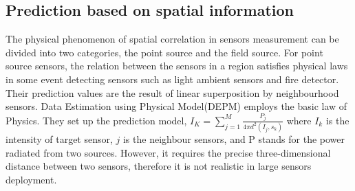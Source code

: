 \subsection{Prediction based on spatial information}
The physical phenomenon of spatial correlation in sensors measurement can be divided into two categories, the point source and the field source\cite{viran:spatialtemporal}. For point source sensors, the relation between the sensors in a region satisfies physical laws in some event detecting sensors such as light ambient sensors and fire detector. 
Their prediction values are the result of linear superposition by neighbourhood sensors. 
Data Estimation using Physical Model(DEPM)\cite{li2008data} employs the basic law of Physics.
They set up the prediction model,  
$I_K =\sum_{j=1}^M\frac{P_j}{4\pi d^2(I_j,s_k)}$
where $I_k$ is the intensity of target sensor, $j$ is the neighbour sensors, and P stands for the power radiated from two sources. 
However, it requires the precise  three-dimensional distance between two sensors, therefore it is not realistic in large sensors deployment.

